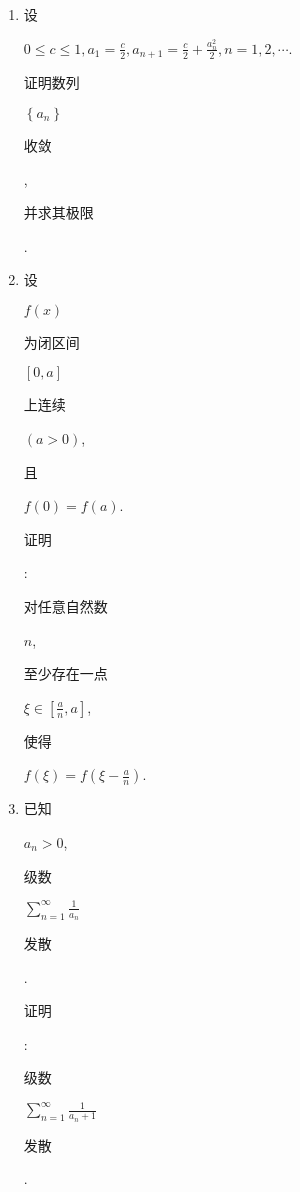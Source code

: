 \documentclass[10pt]{article}
\begin{document}
\begin{enumerate}
  \item \begin{CJK}{UTF8}{mj}设\end{CJK} $0 \leqslant c \leqslant 1, a_{1}=\frac{c}{2}, a_{n+1}=\frac{c}{2}+\frac{a_{n}^{2}}{2}, n=1,2, \cdots$. \begin{CJK}{UTF8}{mj}证明数列\end{CJK} $\left\{a_{n}\right\}$ \begin{CJK}{UTF8}{mj}收敛\end{CJK}, \begin{CJK}{UTF8}{mj}并求其极限\end{CJK}.

  \item \begin{CJK}{UTF8}{mj}设\end{CJK} $f(x)$ \begin{CJK}{UTF8}{mj}为闭区间\end{CJK} $[0, a]$ \begin{CJK}{UTF8}{mj}上连续\end{CJK} $(a>0)$, \begin{CJK}{UTF8}{mj}且\end{CJK} $f(0)=f(a)$. \begin{CJK}{UTF8}{mj}证明\end{CJK}: \begin{CJK}{UTF8}{mj}对任意自然数\end{CJK} $n$, \begin{CJK}{UTF8}{mj}至少存在一点\end{CJK} $\xi \in\left[\frac{a}{n}, a\right]$, \begin{CJK}{UTF8}{mj}使得\end{CJK} $f(\xi)=f\left(\xi-\frac{a}{n}\right)$.

  \item \begin{CJK}{UTF8}{mj}已知\end{CJK} $a_{n}>0$, \begin{CJK}{UTF8}{mj}级数\end{CJK} $\sum_{n=1}^{\infty} \frac{1}{a_{n}}$ \begin{CJK}{UTF8}{mj}发散\end{CJK}. \begin{CJK}{UTF8}{mj}证明\end{CJK}: \begin{CJK}{UTF8}{mj}级数\end{CJK} $\sum_{n=1}^{\infty} \frac{1}{a_{n}+1}$ \begin{CJK}{UTF8}{mj}发散\end{CJK}.


\end{enumerate}
\end{document}
